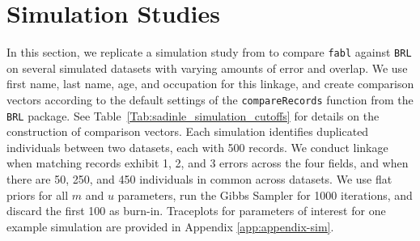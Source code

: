 \documentclass[12pt,letterpaper]{article}
\newcommand{\1}[1]{\mathbb{I}\!\left[#1\right]} %
\begin{document}
%
%
%

\section{Simulation Studies}
\label{sec:simulations}

In this section, we replicate a simulation study from \cite{sadinle_bayesian_2017} to compare \texttt{fabl} against \texttt{BRL} on several simulated datasets with varying amounts of error and overlap. We use first name, last name, age, and occupation for this linkage, and create comparison vectors according to the default settings of the \texttt{compareRecords} function from the \texttt{BRL} package. See Table~\ref{Tab:sadinle_simulation_cutoffs} for details on the construction of comparison vectors. Each simulation identifies duplicated individuals between two datasets, each with 500 records. We conduct linkage when matching records exhibit 1, 2, and 3 errors across the four fields, and when there are 50, 250, and 450 individuals in common across datasets. We use flat priors for all $m$ and $u$ parameters, run the Gibbs Sampler for 1000 iterations, and discard the first 100 as burn-in. Traceplots for parameters of interest for one example simulation are provided in Appendix \ref{app:appendix-sim}.
\end{document}
